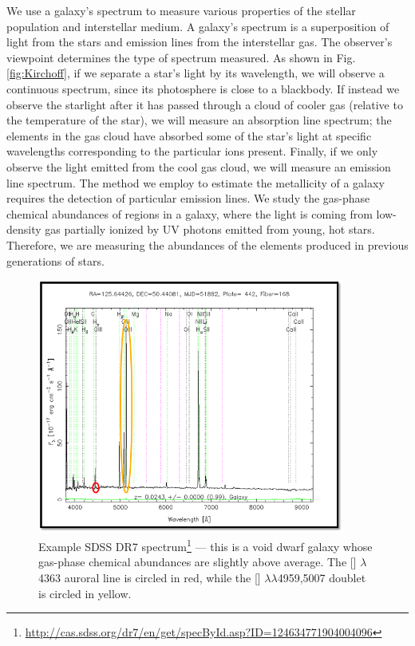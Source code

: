 We use a galaxy's spectrum to measure various properties of the stellar 
population and interstellar medium.  A galaxy's spectrum is a superposition of 
light from the stars and emission lines from the interstellar gas.  The 
observer's viewpoint determines the type of spectrum measured.  As shown in Fig. 
\ref{fig:Kirchoff}, if we separate a star's light by its wavelength, we will 
observe a continuous spectrum, since its photosphere is close to a blackbody.  
If instead we observe the starlight after it has passed through a cloud of 
cooler gas (relative to the temperature of the star), we will measure an 
absorption line spectrum; the elements in the gas cloud have absorbed some of 
the star's light at specific wavelengths corresponding to the particular ions 
present.  Finally, if we only observe the light emitted from the cool gas cloud, 
we will measure an emission line spectrum.  The method we employ to estimate the 
metallicity of a galaxy requires the detection of particular emission lines.  We 
study the gas-phase chemical abundances of  regions in a galaxy, where 
the light is coming from low-density gas partially ionized by UV photons emitted 
from young, hot stars.  Therefore, we are measuring the abundances of the 
elements produced in previous generations of stars.

\begin{figure}
    \includegraphics[width=0.9\textwidth]{Images/Intro/spectrum}
    \caption[Sample (void) dwarf galaxy spectrum]{Example SDSS DR7 
    spectrum\footnote{\url{http://cas.sdss.org/dr7/en/get/specById.asp?ID=124634771904004096}} 
    --- this is a void dwarf galaxy whose gas-phase chemical abundances are 
    slightly above average.  The [] $\lambda$4363 auroral line is 
    circled in red, while the [] $\lambda \lambda$4959,5007 doublet is 
    circled in yellow.}
    \label{fig:spectrum}
\end{figure}


